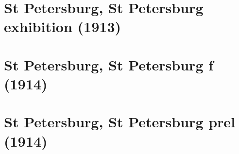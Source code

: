 \documentclass[11pt]{article}
\begin{document}


\clearpage



\clearpage



\clearpage

\section{St Petersburg, St Petersburg exhibition (1913)}


\clearpage



\clearpage



\clearpage



\clearpage



\clearpage



\clearpage

\section{St Petersburg, St Petersburg f (1914)}


\clearpage



\clearpage



\clearpage



\clearpage



\clearpage



\clearpage



\clearpage



\clearpage

\section{St Petersburg, St Petersburg prel (1914)}

\end{document}
